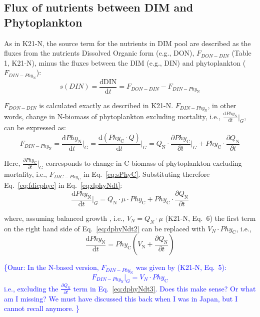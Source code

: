 \documentclass[gmd, manuscript]{copernicus}
\newcommand{\onur}[1]{\textcolor{blue}{\{Onur: #1\}}}
\begin{document}
\subsection{Flux of nutrients between DIM and Phytoplankton}
As in K21-N, the source term for the nutrients in DIM pool are described as the fluxes from the nutrients Dissolved Organic form (e.g., DON), $F_{DON-DIN}$ (Table 1, K21-N), minus the fluxes between the DIM (e.g., DIN) and phytoplankton ($F_{DIN-Phy_\text{N}}$): 
\begin{equation} \label{eq:sdin}
  s(DIN) = \frac{\text{d}\text{DIN}}{\text{d}t} = F_{DON-DIN} - F_{DIN-Phy_\text{N}}
\end{equation}

$F_{DON-DIN}$ is calculated exactly as described in K21-N. $F_{DIN-Phy_\text{N}}$, in other words, change in N-biomass of phytoplankton excluding mortality, i.e., $\frac{\text{d}Phy_\text{N}}{\text{d}t} \big\rvert_G$, can be expressed as:
\begin{equation} \label{eq:dphyNdt}
  F_{DIN-Phy_\text{N}} = \frac{\text{d}Phy_\text{N}}{\text{d}t} \bigg\rvert_G=\frac{\text{d}(Phy_\text{C} \cdot Q)}{\text{d}t} \bigg\rvert_G = Q_\text{N} \cdot \frac{\partial Phy_\text{C}}{\partial t} \bigg\rvert_G + Phy_\text{C} \cdot \frac{\partial Q_\text{N}}{\partial t} 
\end{equation}

Here, $\frac{\partial Phy_\text{C}}{\partial t} \big\rvert_G$ corresponds to change in C-biomass of phytoplankton excluding mortality, i.e., $F_{DIC-Phy_\text{C}}$ in Eq.~\ref{eq:sPhyC}. Substituting therefore Eq.~\ref{eq:fdicphyc} in Eq.~\ref{eq:dphyNdt}:
\begin{equation} \label{eq:dphyNdt2}
  \frac{\text{d}Phy_\text{N}}{\text{d}t} \bigg\rvert_G= Q_\text{N} \cdot \mu \cdot Phy_\text{C} + Phy_\text{C} \cdot \frac{\partial Q_\text{N}}{\partial t} 
\end{equation}

where, assuming balanced growth \citep{Burmaster1979}, i.e., $V_N = Q_N \cdot \mu$  (K21-N, Eq.~6) the first term on the right hand side of Eq.~\ref{eq:dphyNdt2} can be replaced with $V_N \cdot Phy_\text{C}$, i.e., 
\begin{equation} \label{eq:dphyNdt3}
  \frac{\text{d}Phy_\text{N}}{\text{d}t}=  Phy_\text{C} \left( V_\text{N} + \frac{\partial Q_\text{N}}{\partial t} \right)
\end{equation}

\onur{In the N-based version, $F_{DIN-Phy_\text{N}}$ was given by (K21-N, Eq.~5):
\begin{equation}\label{eq:Fdinphy}
  F_{DIN-Phy_{\text{N}}} \bigg\rvert_G = V_N \cdot Phy_{\text{C}}
\end{equation}
i.e., excluding the $\frac{\partial Q_\text{N}}{\partial t}$ term in Eq.~\ref{eq:dphyNdt3}. Does this make sense? Or what am I missing? We must have discussed this back when I was in Japan, but I cannot recall anymore. 
}
\end{document}
